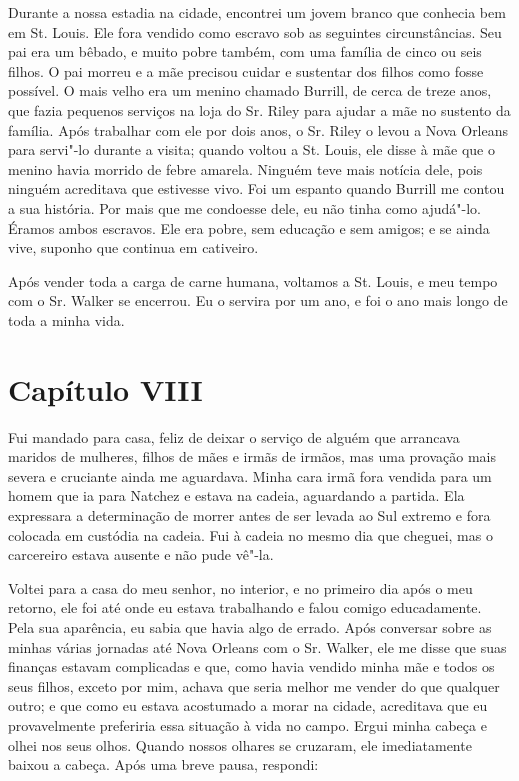 Durante a nossa estadia na cidade, encontrei um jovem branco que
conhecia bem em St. Louis. Ele fora vendido como escravo sob as
seguintes circunstâncias. Seu pai era um bêbado, e muito pobre também,
com uma família de cinco ou seis filhos. O pai morreu e a mãe precisou
cuidar e sustentar dos filhos como fosse possível. O mais velho era um
menino chamado Burrill, de cerca de treze anos, que fazia pequenos
serviços na loja do Sr. Riley para ajudar a mãe no sustento da família.
Após trabalhar com ele por dois anos, o Sr. Riley o levou a Nova Orleans
para servi"-lo durante a visita; quando voltou a St. Louis, ele disse à
mãe que o menino havia morrido de febre amarela. Ninguém teve mais
notícia dele, pois ninguém acreditava que estivesse vivo. Foi um espanto
quando Burrill me contou a sua história. Por mais que me condoesse dele,
eu não tinha como ajudá"-lo. Éramos ambos escravos. Ele era pobre, sem
educação e sem amigos; e se ainda vive, suponho que continua em
cativeiro.

Após vender toda a carga de carne humana, voltamos a St. Louis, e meu
tempo com o Sr. Walker se encerrou. Eu o servira por um ano, e foi o ano
mais longo de toda a minha vida.

\chapter{Capítulo VIII}

Fui mandado para casa, feliz de deixar o serviço de alguém que arrancava
maridos de mulheres, filhos de mães e irmãs de irmãos, mas uma provação
mais severa e cruciante ainda me aguardava. Minha cara irmã fora vendida
para um homem que ia para Natchez e estava na cadeia, aguardando a
partida. Ela expressara a determinação de morrer antes de ser levada ao
Sul extremo e fora colocada em custódia na cadeia. Fui à cadeia no mesmo
dia que cheguei, mas o carcereiro estava ausente e não pude vê"-la.

Voltei para a casa do meu senhor, no interior, e no primeiro dia após o
meu retorno, ele foi até onde eu estava trabalhando e falou comigo
educadamente. Pela sua aparência, eu sabia que havia algo de errado.
Após conversar sobre as minhas várias jornadas até Nova Orleans com o
Sr. Walker, ele me disse que suas finanças estavam complicadas e que,
como havia vendido minha mãe e todos os seus filhos, exceto por mim,
achava que seria melhor me vender do que qualquer outro; e que como eu
estava acostumado a morar na cidade, acreditava que eu provavelmente
preferiria essa situação à vida no campo. Ergui minha cabeça e olhei nos
seus olhos. Quando nossos olhares se cruzaram, ele imediatamente baixou
a cabeça. Após uma breve pausa, respondi:

